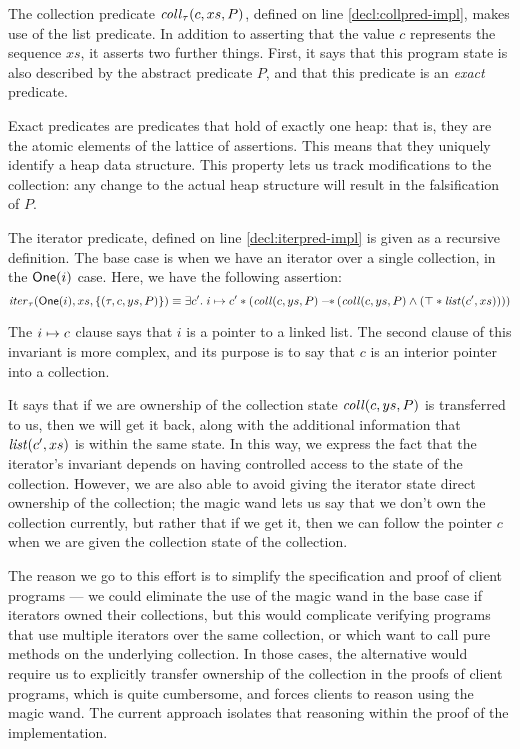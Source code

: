 The collection predicate $\mathit{coll}_\tau(c, xs, P)$, defined on line
\ref{decl:collpred-impl}, makes use of the list predicate. In addition
to asserting that the value $c$ represents the sequence $xs$, it
asserts two further things. First, it says that this program state is
also described by the abstract predicate $P$, and that this predicate
is an \emph{exact} predicate.

Exact predicates are predicates that hold of exactly one heap: that
is, they are the atomic elements of the lattice of assertions. This
means that they uniquely identify a heap data structure. This property
lets us track modifications to the collection: any change to the actual
heap structure will result in the falsification of $P$.  

The iterator predicate, defined on line \ref{decl:iterpred-impl} is 
given as a recursive definition. The base case is when we have an 
iterator over a single collection, in the $\mathsf{One}(i)$ case.  Here, 
we have the following assertion: 
\begin{displaymath}
  \mathit{iter}_\tau(\mathsf{One}(i), xs, \{{(\tau, c, ys, P)}\}) \equiv 
    \exists c'.\; i \mapsto c' * (\mathit{coll}(c,ys,P) -\!\!*\, (\mathit{coll}(c, ys, P) \land (\top * \mathit{list}(c', xs))))
\end{displaymath}

The $i \mapsto c$ clause says that $i$ is a pointer to a linked
list.  The second clause of this invariant is more complex, and its
purpose is to say that $c$ is an interior pointer into a collection.

It says that if we are ownership of the collection state $\mathit{coll}(c,
ys, P)$ is transferred to us, then we will get it back, along with the
additional information that $\mathit{list}(c', xs)$ is within the same
state. In this way, we express the fact that the iterator's invariant
depends on having controlled access to the state of the
collection. However, we are also able to avoid giving the iterator
state direct ownership of the collection; the magic wand lets us say
that we don't own the collection currently, but rather that if we get
it, then we  can follow the pointer $c$ when we are given the
collection state of the collection.

The reason we go to this effort is to simplify the specification and
proof of client programs --- we could eliminate the use of the magic
wand in the base case if iterators owned their collections, but this
would complicate verifying programs that use multiple iterators over
the same collection, or which want to call pure methods on the
underlying collection. In those cases, the alternative would require
us to explicitly transfer ownership of the collection in the proofs of
client programs, which is quite cumbersome, and forces clients to
reason using the magic wand. The current approach isolates that
reasoning within the proof of the implementation.

